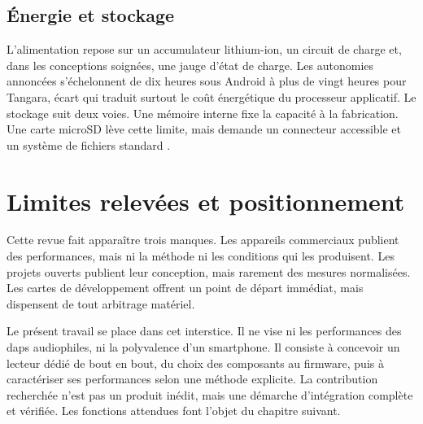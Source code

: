 \subsection{Énergie et stockage}

L'alimentation repose sur un accumulateur lithium-ion, un circuit de charge et, dans les conceptions soignées, une jauge d'état de charge. Les autonomies annoncées s'échelonnent de dix heures sous Android à plus de vingt heures pour Tangara, écart qui traduit surtout le coût énergétique du processeur applicatif. Le stockage suit deux voies. Une mémoire interne fixe la capacité à la fabrication. Une carte microSD lève cette limite, mais demande un connecteur accessible et un système de fichiers standard \cite{sd_card_association_sd_2023}.

\section{Limites relevées et positionnement}

Cette revue fait apparaître trois manques. Les appareils commerciaux publient des performances, mais ni la méthode ni les conditions qui les produisent. Les projets ouverts publient leur conception, mais rarement des mesures normalisées. Les cartes de développement offrent un point de départ immédiat, mais dispensent de tout arbitrage matériel.

Le présent travail se place dans cet interstice. Il ne vise ni les performances des \glspl{dap} audiophiles, ni la polyvalence d'un smartphone. Il consiste à concevoir un lecteur dédié de bout en bout, du choix des composants au firmware, puis à caractériser ses performances selon une méthode explicite. La contribution recherchée n'est pas un produit inédit, mais une démarche d'intégration complète et vérifiée. Les fonctions attendues font l'objet du chapitre suivant.